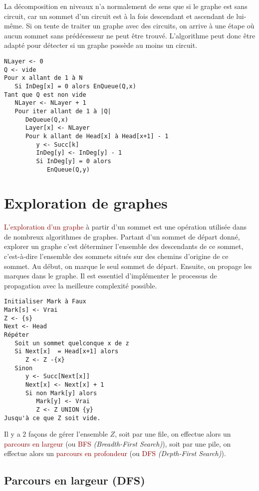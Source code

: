 \documentclass{article}
\newcommand{\red}[1]{\textcolor{darkred}{#1}}
\begin{document}
La décomposition en niveaux n’a normalement de sens que si le graphe est sans circuit, car un sommet d’un circuit est à la fois descendant et ascendant de lui-même. Si on tente de 
traiter un graphe avec des circuits, on arrive à une étape où aucun sommet sans prédécesseur ne peut être trouvé. L’algorithme peut donc être adapté pour détecter si un graphe
possède au moins un circuit.

\begin{verbatim}
NLayer <- 0
Q <- vide
Pour x allant de 1 à N
   Si InDeg[x] = 0 alors EnQueue(Q,x)
Tant que Q est non vide
   NLayer <- NLayer + 1
   Pour iter allant de 1 à |Q|
      DeQueue(Q,x)
      Layer[x] <- NLayer
      Pour k allant de Head[x] à Head[x+1] - 1
         y <- Succ[k]
         InDeg[y] <- InDeg[y] - 1
         Si InDeg[y] = 0 alors
            EnQueue(Q,y)
\end{verbatim}

\section{Exploration de graphes}

\red{L’exploration d’un graphe} à partir d’un sommet est une opération utilisée dans de nombreux algorithmes de graphes. Partant d’un sommet de départ donné, explorer un graphe
c’est déterminer l’ensemble des descendants de ce sommet, c’est-à-dire l’ensemble des sommets situés sur des chemins d’origine de ce sommet. Au début, on marque le seul 
sommet de départ. Ensuite, on propage les marques dans le graphe. Il est essentiel d’implémenter le processus de propagation avec la meilleure complexité possible.

\begin{verbatim}
Initialiser Mark à Faux
Mark[s] <- Vrai
Z <- {s}
Next <- Head
Répéter
   Soit un sommet quelconque x de z
   Si Next[x]  = Head[x+1] alors
      Z <- Z -{x}
   Sinon
      y <- Succ[Next[x]]
      Next[x] <- Next[x] + 1
      Si non Mark[y] alors
         Mark[y] <- Vrai
         Z <- Z UNION {y}
Jusqu'à ce que Z soit vide.
\end{verbatim}

\noindent Il y a 2 façons de gérer l'ensemble $Z$, soit par une file, on effectue alors un \red{parcours en largeur} (ou \red{BFS} \textit{(Breadth-First Search)}), soit par une 
pile, on effectue alors un \red{parcours en profondeur} (ou \red{DFS} \textit{(Depth-First Search)}).

\subsection{Parcours en largeur (DFS)}
\end{document}
